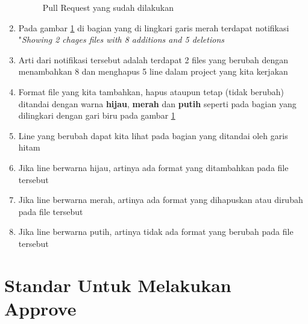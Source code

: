 \begin{enumerate}
\begin{figure}[!htbp]
\caption{Pull Request yang sudah dilakukan}
\label{fig:line}
\end{figure}
\item Pada gambar \ref{fig:line} di bagian yang di lingkari garis merah terdapat notifikasi "\textit{Showing 2 chages files with 8 additions and 5 deletions}
\item Arti dari notifikasi tersebut adalah terdapat 2 files yang berubah dengan menambahkan 8 dan menghapus 5 line dalam project yang kita kerjakan
\item Format file yang kita tambahkan, hapus ataupun tetap (tidak berubah) ditandai dengan warna \textbf{hijau}, \textbf{merah} dan \textbf{putih} seperti pada bagian yang dilingkari dengan gari biru pada gambar \ref{fig:line}
\item Line yang berubah dapat kita lihat pada bagian yang ditandai oleh garis hitam
\item Jika line berwarna hijau, artinya ada format yang ditambahkan pada file tersebut
\item Jika line berwarna merah, artinya ada format yang dihapuskan atau dirubah pada file tersebut
\item Jika line berwarna putih, artinya tidak ada format yang berubah pada file tersebut
\end{enumerate}

\section{Standar Untuk Melakukan Approve}

